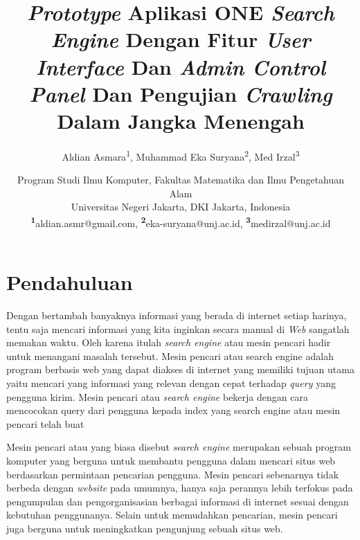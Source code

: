 \documentclass[
	a4paper, %
	10pt, %
	unnumberedsections, %
	twoside, %
]{LTJournalArticle}
\title{\textit{Prototype} Aplikasi ONE \textit{Search Engine} Dengan Fitur \textit{User Interface} Dan \textit{Admin Control Panel} Dan Pengujian \textit{Crawling} Dalam Jangka Menengah} %
\author{
	Aldian Asmara\textsuperscript{1}, Muhammad Eka Suryana\textsuperscript{2}, Med Irzal\textsuperscript{3}
}
\date{
	\footnotesize
	Program Studi Ilmu Komputer, Fakultas Matematika dan Ilmu Pengetahuan Alam \\
	Universitas Negeri Jakarta, DKI Jakarta, Indonesia \\
	\textsuperscript{\textbf{1}}aldian.asmr@gmail.com, 
	\textsuperscript{\textbf{2}}eka-suryana@unj.ac.id, 
	\textsuperscript{\textbf{3}}medirzal@unj.ac.id
}
\begin{document}
\maketitle %


\section{Pendahuluan}

Dengan bertambah banyaknya informasi yang berada di internet setiap harinya, tentu saja mencari informasi yang kita inginkan secara manual di \textit{Web} sangatlah memakan waktu. Oleh karena itulah \textit{search engine} atau mesin pencari hadir untuk menangani masalah tersebut. Mesin pencari atau search engine adalah program berbasis web yang dapat diakses di internet yang memiliki tujuan utama yaitu mencari yang informasi yang relevan dengan cepat terhadap \textit{query} yang pengguna kirim. Mesin pencari atau \textit{search engine} bekerja dengan cara mencocokan query dari pengguna kepada index yang search engine atau mesin pencari telah buat

Mesin pencari atau yang biasa disebut \emph{search engine} merupakan sebuah program komputer yang berguna untuk membantu pengguna dalam mencari situs web berdasarkan permintaan pencarian pengguna. Mesin pencari sebenarnya tidak berbeda dengan \textit{website} pada umumnya, hanya saja perannya lebih terfokus pada pengumpulan dan pengorganisasian berbagai informasi di internet sesuai dengan kebutuhan penggunanya. Selain untuk memudahkan pencarian, mesin pencari juga berguna untuk meningkatkan pengunjung sebuah situs web.
\end{document}

